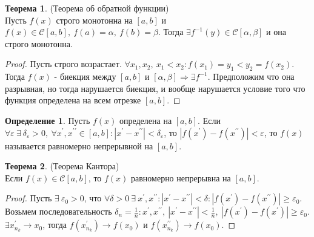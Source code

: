 \documentclass[a4paper, 12pt]{article}
\renewcommand{\epsilon}{\varepsilon}
\theoremstyle{definition}
\newtheorem*{definition}{Определение}
\newtheorem*{theorem}{Теорема}
\begin{document}
        \begin{theorem} (Теорема об обратной функции)\\
            Пусть $f(x)$ строго монотонна на $[a,b]$ и $f(x)\in\mathcal{C}[a,b],\ f(a)=\alpha,\ f(b)=\beta$. Тогда $\exists f^{-1}(y)\in\mathcal{C}[\alpha,\beta]$ и она строго монотонна. 
        \end{theorem} 
        \begin{proof}
            Пусть строго возрастает. $\forall x_1,x_2,\ x_1<x_2: f(x_1)=y_1<y_2=f(x_2)$. Тогда $f(x)$ - биекция между $[a,b]$ и $[\alpha,\beta] \Rightarrow \exists f^{-1}$. Предположим что она разрывная, но тогда нарушается биекция, и вообще нарушается условие того что функция определена на всем отрезке $[a,b]$.
        \end{proof} 
        \begin{definition}
            Пусть $f(x)$ определена на $[a,b]$. Если $\forall \epsilon\ \exists\ \delta_{\epsilon}>0,\ \forall x^{\prime}, x^{\prime\prime}\in [a,b]: |x^{\prime}-x^{\prime\prime}|<\delta_{\epsilon}$, то $|f(x^{\prime})-f(x^{\prime\prime})|<\epsilon$, то $f(x)$ называется равномерно непрерывной на $[a,b]$.
        \end{definition} 
        \begin{theorem} (Теорема Кантора)\\
            Если $f(x)\in \mathcal{C}[a,b]$, то $f(x)$ равномерно непрерывна на $[a,b]$.
        \end{theorem} 
        \begin{proof}
            Пусть $\exists\ \epsilon_0>0$, что $\forall \delta>0\ \exists\ x^{\prime}, x^{\prime\prime}: |x^{\prime}-x^{\prime\prime}|<\delta: |f(x^{\prime})-f(x^{\prime\prime})|\geq \epsilon_0$. Возьмем последовательность $\delta_n=\frac{1}{n}: x^{\prime},x^{\prime\prime},\ |x^{\prime}-x^{\prime\prime}|<\frac{1}{n},\ |f(x^{\prime})-f(x^{\prime})|\geq \epsilon_0$. $\exists x_{n_k}^{\prime}\to x_0$, тогда $f(x_{n_k}^{\prime})\to f(x_0)$ и $f(x_{n_k}^{\prime\prime})\to f(x_0)$.
        \end{proof}
\end{document}

